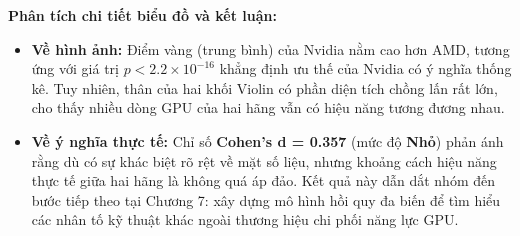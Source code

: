 \textbf{Phân tích chi tiết biểu đồ và kết luận:}
\begin{itemize}
    \item \textbf{Về hình ảnh:} Điểm vàng (trung bình) của Nvidia nằm cao hơn AMD, tương ứng với giá trị $p < 2.2 \times 10^{-16}$ khẳng định ưu thế của Nvidia có ý nghĩa thống kê. Tuy nhiên, thân của hai khối Violin có phần diện tích chồng lấn rất lớn, cho thấy nhiều dòng GPU của hai hãng vẫn có hiệu năng tương đương nhau.
    \item \textbf{Về ý nghĩa thực tế:} Chỉ số \textbf{Cohen's d = 0.357} (mức độ \textbf{Nhỏ}) phản ánh rằng dù có sự khác biệt rõ rệt về mặt số liệu, nhưng khoảng cách hiệu năng thực tế giữa hai hãng là không quá áp đảo. Kết quả này dẫn dắt nhóm đến bước tiếp theo tại Chương 7: xây dựng mô hình hồi quy đa biến để tìm hiểu các nhân tố kỹ thuật khác ngoài thương hiệu chi phối năng lực GPU.
\end{itemize}
